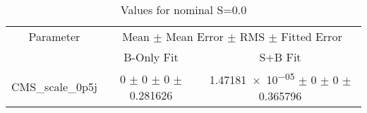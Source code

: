 \begin{table}
\centering
\caption{Values for nominal S=0.0}
\begin{tabular}{ccc}
\toprule
Parameter & \multicolumn{2}{c}{Mean $\pm$ Mean Error $\pm$ RMS $\pm$ Fitted Error}\\
 & B-Only Fit & S+B Fit\\
\midrule
CMS\_scale\_0p5j & \num{0} $\pm$ \num{0} $\pm$ \num{0} $\pm$ \num{0.281626} & \num{1.47181e-05} $\pm$ \num{0} $\pm$ \num{0} $\pm$ \num{0.365796}\\
\bottomrule
\end{tabular}
\end{table}